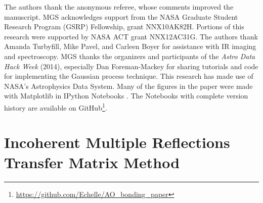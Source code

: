 \documentclass[osajnl,twocolumn,showpacs,superscriptaddress,11pt]{revtex4-1} %
\begin{document}
The authors thank the anonymous referee, whose comments improved the manuscript.  MGS acknowledges support from the NASA Graduate Student Research Program (GSRP) Fellowship, grant NNX10AK82H.  Portions of this research were supported by NASA ACT grant NNX12AC31G.  The authors thank Amanda Turbyfill, Mike Pavel, and Carleen Boyer for assistance with IR imaging and spectroscopy.  MGS thanks the organizers and participants of the \emph{Astro Data Hack Week} (2014), especially Dan Foreman-Mackey for sharing tutorials and code for implementing the Gaussian process technique.  This research has made use of NASA's Astrophysics Data System.  Many of the figures in the paper were made with Matplotlib \cite{Hunter:2007} in IPython Notebooks \cite{PER-GRA:2007}.  The Notebooks with complete version history are available on GitHub\footnote{\url{https://github.com/Echelle/AO_bonding_paper}}.

\appendix

\section{Incoherent Multiple Reflections Transfer Matrix Method}
\label{sec:Append-IMRTMM}
\end{document}
